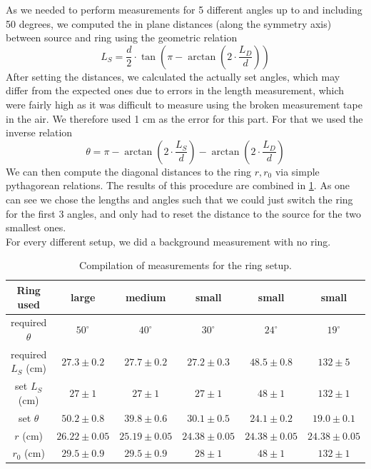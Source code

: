 \documentclass[a4paper,12pt]{article}
\begin{document}
As we needed to perform measurements for 5 different angles up to and including 50 degrees, we computed the in plane distances (along the symmetry axis) between source and ring using the geometric relation
\begin{equation}
	L_S = \frac{d}{2} \cdot \tan{\left( \pi - \arctan{\left( 2 \cdot \frac{L_D}{d} \right)} \right)}
\end{equation}
After setting the distances, we calculated the actually set angles, which may differ from the expected ones due to errors in the length measurement, which were fairly high as it was difficult to measure using the broken measurement tape in the air. We therefore used 1 cm as the error for this part. For that we used the inverse relation
\begin{equation}
	\theta = \pi - \arctan{\left( 2 \cdot \frac{L_S}{d} \right)} - \arctan{\left( 2 \cdot \frac{L_D}{d} \right)}
\end{equation}
We can then compute the diagonal distances to the ring $r, r_0$ via simple pythagorean relations. The results of this procedure are combined in \cref{tab:ringsetup}. As one can see we chose the lengths and angles such that we could just switch the ring for the first 3 angles, and only had to reset the distance to the source for the two smallest ones.\\
For every different setup, we did a background measurement with no ring.

\begin{table}[H]
	\renewcommand{\arraystretch}{1}
	\centering
	\Large
	\begin{adjustbox}{width=\textwidth}
		\begin{tabular}{c|ccccc}
			\hline
			Ring used & large & medium & small & small & small \\
			\hline
			required $\theta$ & $50^\circ$ & $40^\circ$ & $30^\circ$ & $24^\circ$ & $19^\circ$ \\
			\hline
			required $L_S$ (cm) & $27.3 \pm 0.2$ & $27.7 \pm 0.2$ & $27.2 \pm 0.3$ & $48.5 \pm 0.8$ & $132 \pm 5$ \\
			\hline
			set $L_S$ (cm) & $27 \pm 1$ & $27 \pm 1$ & $27 \pm 1$ & $48 \pm 1$ & $132 \pm 1$ \\
			\hline
			set $\theta$ & $50.2 \pm 0.8$ & $39.8 \pm 0.6$ & $30.1 \pm 0.5$ & $24.1 \pm 0.2$ & $19.0 \pm 0.1$ \\
			\hline
			$r$ (cm) & $26.22 \pm 0.05$ & $25.19 \pm 0.05$ & $24.38 \pm 0.05$ & $24.38 \pm 0.05$ & $24.38 \pm 0.05$ \\
			\hline
			$r_0$ (cm) & $29.5 \pm 0.9$ & $29.5 \pm 0.9$ & $28 \pm 1$ & $48 \pm 1$ & $132 \pm 1$ \\
			\hline
		\end{tabular}
	\end{adjustbox}
	\caption{Compilation of measurements for the ring setup. }
	\label{tab:ringsetup}
\end{table}
 
\end{document}
